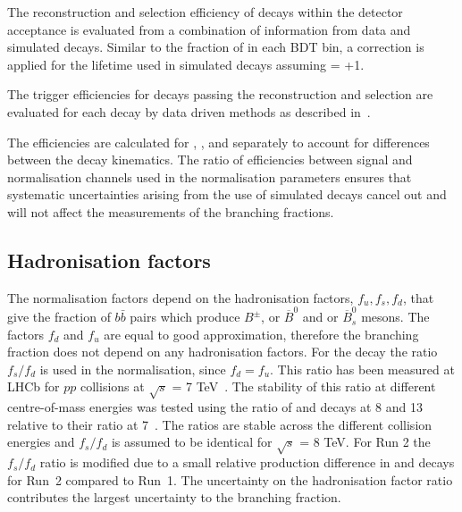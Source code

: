 {{The reconstruction and selection efficiency of decays within the detector acceptance is evaluated from a combination of information from data and simulated decays. Similar to the fraction of \bsmumu in each BDT bin, a correction is applied for the lifetime used in simulated \bsmumu decays assuming \ADG = +1. 

The trigger efficiencies for decays passing the reconstruction and selection are evaluated for each decay by data driven methods as described in~\cite{Tolk:2148631, Tolk:1557354}. %

The efficiencies are calculated for \bsmumu, \bdmumu, \bdkpi and \bujpsik separately to account for differences between the decay kinematics. The ratio of efficiencies between signal and normalisation channels used in the normalisation parameters ensures that systematic uncertainties arising from the use of simulated decays cancel out and will not affect the measurements of the \bmumu branching fractions.

\subsection{Hadronisation factors}
\label{hadronfact}
The normalisation factors depend on the hadronisation factors, $f_{u}, f_{s}, f_{d}$, that give the fraction of $b\bar{b}$ pairs which produce $B^{\pm}$, \bd or $\overline{B}^{0}$ and \bs or $\overline{B}^{0}_{s}$ mesons. %
The factors $f_{d}$ and $f_{u}$ are equal to good approximation, therefore the \bdmumu branching fraction does not depend on any hadronisation factors. For the \bsmumu decay the ratio $f_{s}/f_{d}$ is used in the normalisation, since $f_{d} = f_{u}$. This ratio has been measured at LHCb for $pp$ collisions at $\sqrt{s}$ = 7 TeV~\cite{LHCb-CONF-2013-011}. The stability of this ratio at different centre-of-mass energies was tested using the ratio of \bsjpsiphi and \bujpsik decays at 8 and 13 \tev relative to their ratio at 7~\tev. %
The ratios are stable across the different collision energies and $f_{s}/f_{d}$ is assumed to be identical for $\sqrt{s}$ = 8 TeV. For Run 2 the $f_{s}/f_{d}$ ratio is modified due to a small relative production difference in \bsjpsiphi and \bujpsik decays for Run~2 compared to Run~1. 
The uncertainty on the hadronisation factor ratio contributes the largest uncertainty to the \bsmumu branching fraction. 

}}
